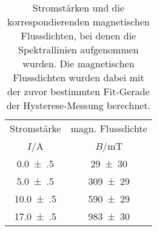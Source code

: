 \begin{table}[!h]
	\centering
	\begin{tabular}{cc}
		\toprule
		Stromstärke & magn. Flussdichte\\
		$I$/\si{\ampere} & $B$/\si{\milli\tesla}\\
\midrule
		\num{0.0(5)} & \num{29(30)}\\
		\num{5.0(5)} & \num{309(29)}\\
		\num{10.0(5)} & \num{590(29)}\\
		\num{17.0(5)} & \num{983(30)}\\
		\bottomrule
	\end{tabular}
	\caption{Stromstärken und die korrespondierenden magnetischen Flussdichten,
                    bei denen die Spektrallinien aufgenommen wurden. 
                    Die magnetischen Flussdichten wurden dabei mit der zuvor bestimmten Fit-Gerade der
                    Hysterese-Messung berechnet. \label{tab:strom_magnetfeld}}
\end{table}
